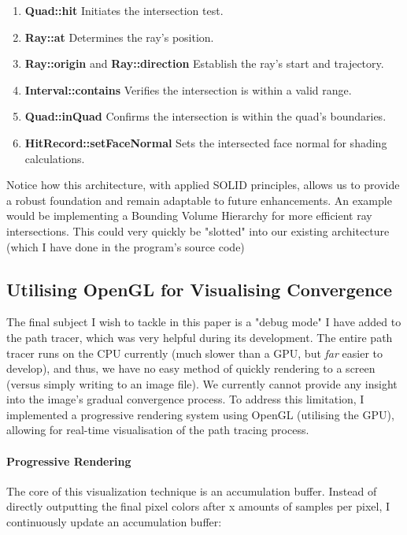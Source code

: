 \documentclass[12pt]{article}
\begin{document}
\begin{enumerate}
    \item \textbf{Quad::hit} Initiates the intersection test.

    \item \textbf{Ray::at} Determines the ray's position.
    \item \textbf{Ray::origin} and \textbf{Ray::direction} Establish the ray's start and trajectory.

    \item \textbf{Interval::contains} Verifies the intersection is within a valid range.
    \item \textbf{Quad::inQuad} Confirms the intersection is within the quad's boundaries.
    \item \textbf{HitRecord::setFaceNormal} Sets the intersected face normal for shading calculations.
\end{enumerate}

Notice how this architecture, with applied SOLID principles, allows us to provide a robust foundation and remain adaptable to future enhancements. An example would be implementing a Bounding Volume Hierarchy for more efficient ray intersections. This could very quickly be "slotted" into our existing architecture (which I have done in the program's source code)

\subsection{Utilising OpenGL for Visualising Convergence}


The final subject I wish to tackle in this paper is a "debug mode" I have added to the path tracer, which was very helpful during its development. The entire path tracer runs on the CPU currently (much slower than a GPU, but \textit{far} easier to develop), and thus, we have no easy method of quickly rendering to a screen (versus simply writing to an image file). We currently cannot provide any insight into the image's gradual convergence process. To address this limitation, I implemented a progressive rendering system using OpenGL (utilising the GPU), allowing for real-time visualisation of the path tracing process.

\paragraph{Progressive Rendering} The core of this visualization technique is an accumulation buffer. Instead of directly outputting the final pixel colors after x amounts of samples per pixel, I continuously update an accumulation buffer:
\end{document}
